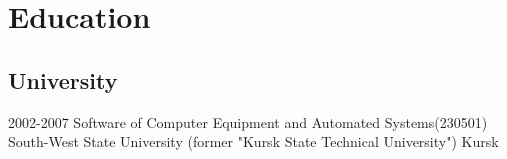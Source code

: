 \documentclass[11pt,a4paper,sans]{moderncv}
\newcommand{\lang}[2]{#2}
\begin{document}








\section
    {\lang
        {Образование}
        {Education}}

\subsection
    {\lang
        {Высшее образование}
        {University}}

\cventry
    {2002-2007}
    {\lang
        {Инженер по специальности «Программное обеспечение вычислительной техники и автоматизированных систем»}
        {Software of Computer Equipment and Automated Systems(230501)}}
    {\lang
        {«Юго-Западный государственный университет» (бывший «Курский государственный технический университет»)}
        {South-West State University (former "Kursk State Technical University")}}
    {\lang
        {Курск}
        {Kursk}}
    {}
    {}
\end{document}
